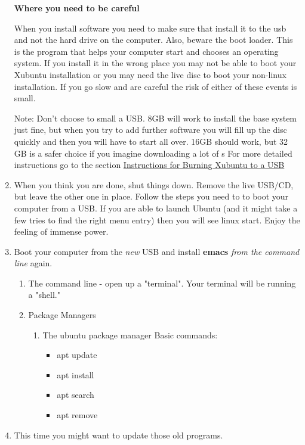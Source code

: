 \documentclass{article}
\begin{document}
\begin{enumerate}
\textbf{\textbf{Where you need to be careful}}

When you install software you need to make sure that install it to the usb and not the hard drive on the computer. Also, beware the boot loader. This is the program that helps your computer start and chooses an operating system. If you install it in the wrong place you may not be able to boot your Xubuntu installation or you may need the live disc to boot your non-linux installation. If you go slow and are careful the risk of either of these events is small. 

Note: Don't choose to small a USB. 8GB will work to install the base system just fine, but when you try to add further software you will fill up the disc quickly and then you will have to start all over. 16GB should work, but 32 GB is a safer choice if you imagine downloading a lot of s
For more detailed instructions go to the section \hyperref[sec:orgc3c142a]{Instructions for Burning Xubuntu to a USB}
\item When you think you are done, shut things down. Remove the live USB/CD, but leave the other one in place. Follow the steps you need to to boot your computer from a USB. If you are able to launch Ubuntu (and it might take a few tries to find the right menu entry) then you will see linux start. Enjoy the feeling of immense power.
\item Boot your computer from the \emph{new} USB and install \textbf{emacs} \emph{from the command line} again.
\begin{enumerate}
\item The command line - open up a "terminal". Your terminal will be running a "shell."
\item Package Managers
\begin{enumerate}
\item The ubuntu package manager
Basic commands: 
\begin{itemize}
\item apt update
\item apt install
\item apt search
\item apt remove
\end{itemize}
\end{enumerate}
\end{enumerate}
\item This time you might want to update those old programs.
\end{enumerate}
\end{document}
